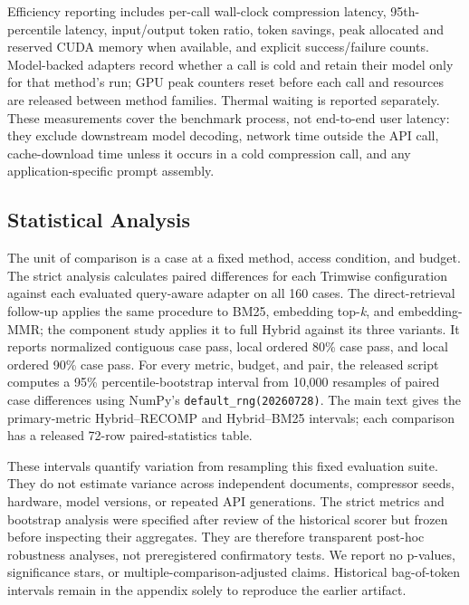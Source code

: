 \documentclass[
]{article}
\begin{document}
Efficiency reporting includes per-call wall-clock compression latency,
95th-percentile latency, input/output token ratio, token savings, peak
allocated and reserved CUDA memory when available, and explicit
success/failure counts. Model-backed adapters record whether a call is
cold and retain their model only for that method's run; GPU peak
counters reset before each call and resources are released between
method families. Thermal waiting is reported separately. These
measurements cover the benchmark process, not end-to-end user latency:
they exclude downstream model decoding, network time outside the API
call, cache-download time unless it occurs in a cold compression call,
and any application-specific prompt assembly.

\subsection{Statistical Analysis}\label{statistical-analysis}

The unit of comparison is a case at a fixed method, access condition,
and budget. The strict analysis calculates paired differences for each
Trimwise configuration against each evaluated query-aware adapter on all
160 cases. The direct-retrieval follow-up applies the same procedure to
BM25, embedding top-\emph{k}, and embedding-MMR; the component study applies
it to full Hybrid against its three variants. It reports normalized contiguous
case pass, local ordered 80\% case pass, and local ordered 90\% case pass.
For every metric, budget, and pair, the released script computes a
95\% percentile-bootstrap interval from 10,000 resamples of paired case
differences using NumPy's \texttt{default\_rng(20260728)}. The main text gives
the primary-metric Hybrid--RECOMP and Hybrid--BM25 intervals; each comparison
has a released 72-row paired-statistics table.

These intervals quantify variation from resampling this fixed evaluation
suite. They do not estimate variance across independent documents,
compressor seeds, hardware, model versions, or repeated API generations.
The strict metrics and bootstrap analysis were specified after review of the
historical scorer but frozen before inspecting their aggregates. They are
therefore transparent post-hoc robustness analyses, not preregistered
confirmatory tests. We report no p-values, significance stars, or
multiple-comparison-adjusted claims. Historical bag-of-token intervals remain in
the appendix solely to reproduce the earlier artifact.
\end{document}
